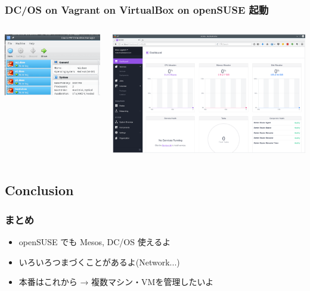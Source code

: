 \documentclass[aspectratio=169,11pt,hyperref={colorlinks=true}]{beamer}
\begin{document}
\begin{frame}
  \frametitle{DC/OS on Vagrant on VirtualBox on openSUSE 起動\!}
  \begin{columns}[T]
    \begin{column}{.50\textwidth}
      \begin{center}
        \includegraphics[width=1.0\textwidth]{dcos_vms.png}
      \end{center}
    \end{column}
    \begin{column}{.50\textwidth}
      \begin{center}
        \includegraphics[width=1.0\textwidth]{DCOS_firefox.png}
      \end{center}
    \end{column}
  \end{columns}
\end{frame}

\subsection{Conclusion}
\begin{frame}
\frametitle{まとめ}
  \begin{itemize}
    \item openSUSE でも Mesos, DC/OS 使えるよ
    \item いろいろつまづくことがあるよ(Network...)
    \item 本番はこれから → 複数マシン・VMを管理したいよ
  \end{itemize}
\end{frame}
\end{document}
